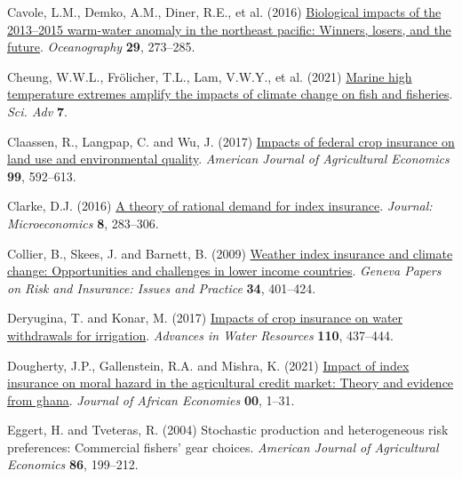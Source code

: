 \documentclass[
  letterpaper,
  DIV=11,
  numbers=noendperiod]{scrartcl}
\newlength{\cslhangindent}
\newlength{\cslentryspacingunit} %
\newenvironment{CSLReferences}[2] %
 {%
  \setlength{\parindent}{0pt}
  \ifodd #1
  \let\oldpar\par
  \def\par{\hangindent=\cslhangindent\oldpar}
  \fi
  \setlength{\parskip}{#2\cslentryspacingunit}
 }%
 {}
\theoremstyle{plain}
\theoremstyle{plain}
\theoremstyle{remark}
\begin{document}
\begin{CSLReferences}{1}{0}
\leavevmode{}%
Cavole, L.M., Demko, A.M., Diner, R.E., et al. (2016)
\href{https://doi.org/10.5670/oceanog.2016.32}{Biological impacts of the
2013--2015 warm-water anomaly in the northeast pacific: Winners, losers,
and the future}. \emph{Oceanography} \textbf{29}, 273--285.

\leavevmode{}%
Cheung, W.W.L., Frölicher, T.L., Lam, V.W.Y., et al. (2021)
\href{https://www.science.org}{Marine high temperature extremes amplify
the impacts of climate change on fish and fisheries}. \emph{Sci. Adv}
\textbf{7}.

\leavevmode{}%
Claassen, R., Langpap, C. and Wu, J. (2017)
\href{https://doi.org/10.1093/AJAE/AAW075}{Impacts of federal crop
insurance on land use and environmental quality}. \emph{American Journal
of Agricultural Economics} \textbf{99}, 592--613.

\leavevmode{}%
Clarke, D.J. (2016) \href{https://doi.org/10.1257/mic.20140103}{A theory
of rational demand for index insurance}. \emph{Journal: Microeconomics}
\textbf{8}, 283--306.

\leavevmode{}%
Collier, B., Skees, J. and Barnett, B. (2009)
\href{https://doi.org/10.1057/gpp.2009.11}{Weather index insurance and
climate change: Opportunities and challenges in lower income countries}.
\emph{Geneva Papers on Risk and Insurance: Issues and Practice}
\textbf{34}, 401--424.

\leavevmode{}%
Deryugina, T. and Konar, M. (2017)
\href{https://doi.org/10.1016/j.advwatres.2017.03.013}{Impacts of crop
insurance on water withdrawals for irrigation}. \emph{Advances in Water
Resources} \textbf{110}, 437--444.

\leavevmode{}%
Dougherty, J.P., Gallenstein, R.A. and Mishra, K. (2021)
\href{https://doi.org/10.1093/jafeco/ejab003}{Impact of index insurance
on moral hazard in the agricultural credit market: Theory and evidence
from ghana}. \emph{Journal of African Economies} \textbf{00}, 1--31.

\leavevmode{}%
Eggert, H. and Tveteras, R. (2004) Stochastic production and
heterogeneous risk preferences: Commercial fishers' gear choices.
\emph{American Journal of Agricultural Economics} \textbf{86}, 199--212.


\end{CSLReferences}
\end{document}
